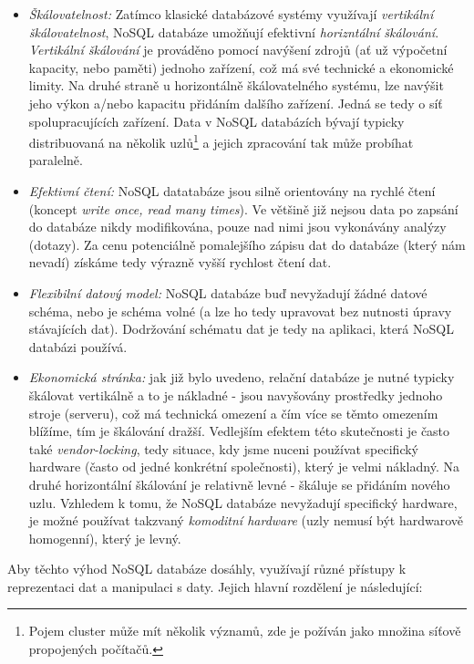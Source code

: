 \begin{itemize}
  \item{\textit{Škálovatelnost:}} Zatímco klasické databázové systémy využívají \textit{vertikální škálovatelnost}, NoSQL databáze umožňují efektivní \textit{horizntální škálování}. \textit{Vertikální škálování} je prováděno pomocí navýšení zdrojů (ať už výpočetní kapacity, nebo paměti) jednoho zařízení, což má své technické a ekonomické limity. Na druhé straně u horizontálně škálovatelného systému, lze navýšit jeho výkon a/nebo kapacitu přidáním dalšího zařízení. Jedná se tedy o síť spolupracujících zařízení. Data v NoSQL databázích bývají typicky distribuovaná na několik uzlů\footnote{Pojem cluster může mít několik významů, zde je požíván jako množina síťově propojených počítačů.} a jejich zpracování tak může probíhat paralelně.
  \item{\textit{Efektivní čtení:}} NoSQL datatabáze jsou silně orientovány na rychlé čtení (koncept \textit{write once, read many times}). Ve většině již nejsou data po zapsání do databáze nikdy modifikována, pouze nad nimi jsou vykonávány analýzy (dotazy). Za cenu potenciálně pomalejšího zápisu dat do databáze (který nám nevadí) získáme tedy výrazně vyšší rychlost čtení dat.
  \item{\textit{Flexibilní datový model:}} NoSQL databáze buď nevyžadují žádné datové schéma, nebo je schéma volné (a lze ho tedy upravovat bez nutnosti úpravy stávajících dat). Dodržování schématu dat je tedy na aplikaci, která NoSQL databázi používá.
  \item{\textit{Ekonomická stránka:}} jak již bylo uvedeno, relační databáze je nutné typicky škálovat vertikálně a to je nákladné - jsou navyšovány prostředky jednoho stroje (serveru), což má technická omezení a čím více se těmto omezením blížíme, tím je škálování dražší. Vedlejším efektem této skutečnosti je často také \textit{vendor-locking}, tedy situace, kdy jsme nuceni používat specifický hardware (často od jedné konkrétní společnosti), který je velmi nákladný. Na druhé horizontální škálování je relativně levné - škáluje se přidáním nového uzlu. Vzhledem k tomu, že NoSQL databáze nevyžadují specifický hardware, je možné používat takzvaný \textit{komoditní hardware} (uzly nemusí být hardwarově homogenní), který je levný.
\end{itemize}

Aby těchto výhod NoSQL databáze dosáhly, využívají různé přístupy k reprezentaci dat a manipulaci s daty. Jejich hlavní rozdělení je následující:

